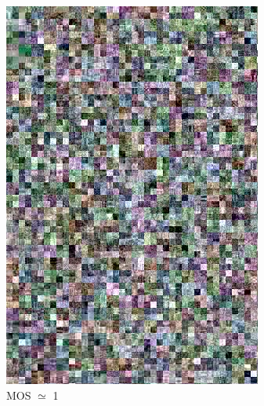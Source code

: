 \documentclass{article}
\begin{document}
\begin{figure}[ht]
\begin{subfigure}{2.9cm}
  \includegraphics[width=0.9\linewidth]{figures/ac_dc_shuffle_xor_chrominance_luminance_76_274007}
  \caption{MOS $\simeq$ 1}
  \label{fig:sub2}
\end{subfigure}
\begin{subfigure}{2.9cm}
  \centering

\end{subfigure}
\end{figure}
\end{document}
